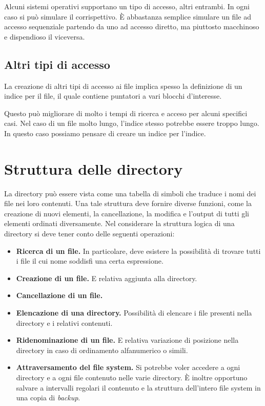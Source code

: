         Alcuni sistemi operativi supportano un tipo di accesso, altri entrambi. In ogni caso si può simulare il corrispettivo. È abbastanza semplice simulare un file ad accesso sequenziale partendo da uno ad accesso diretto, ma piuttosto macchinoso e dispendioso il viceversa.
        
    \subsection{Altri tipi di accesso}
        La creazione di altri tipi di accesso ai file implica spesso la definizione di un indice per il file, il quale contiene puntatori a vari blocchi d'interesse.
        
        Questo può migliorare di molto i tempi di ricerca e acceso per alcuni specifici casi. Nel caso di un file molto lungo, l'indice stesso potrebbe essere troppo lungo. In questo caso possiamo pensare di creare un indice per l'indice.
    
\section{Struttura delle directory}
    La directory può essere vista come una tabella di simboli che traduce i nomi dei file nei loro contenuti. Una tale struttura deve fornire diverse funzioni, come la creazione di nuovi elementi, la cancellazione, la modifica e l'output di tutti gli elementi ordinati diversamente. Nel considerare la struttura logica di una directory si deve tener conto delle seguenti operazioni:
    \begin{itemize}
        \item \textbf{Ricerca di un file.} In particolare, deve esistere la possibilità di trovare tutti i file il cui nome soddisfi una certa espressione.
        
        \item \textbf{Creazione di un file.} E relativa aggiunta alla directory.
        
        \item \textbf{Cancellazione di un file.}
        
        \item \textbf{Elencazione di una directory.} Possibilità di elencare i file presenti nella directory e i relativi contenuti.
        
        \item \textbf{Ridenominazione di un file.} E relativa variazione di posizione nella directory in caso di ordinamento alfanumerico o simili.
        
        \item \textbf{Attraversamento del file system.} Si potrebbe voler accedere a ogni directory e a ogni file contenuto nelle varie directory. È inoltre opportuno salvare a intervalli regolari il contenuto e la struttura dell'intero file system in una copia di \textit{backup}.
    \end{itemize}
    
